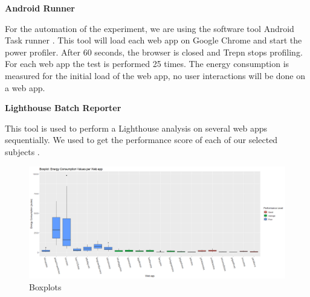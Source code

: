 \textbf{Android Runner}

For the automation of the experiment, we are using the software tool Android Task runner \cite{WEBSITE:10}. This tool will load each web app on Google Chrome and start the power profiler. After 60 seconds, the browser is closed and Trepn stops profiling. For each web app the test is performed 25 times. The energy consumption is measured for the initial load of the web app, no user interactions will be done on a web app.
\newline


\textbf{Lighthouse Batch Reporter}

This tool is used to perform a Lighthouse analysis on several web apps sequentially. We used to get the performance score of each of our selected subjects \cite{WEBSITE:12}.

\begin{figure}
  \includegraphics[width=\textwidth]{./NewImages/Fig_3_Boxplot_for_All_Websites.png}
  \caption{Boxplots}
  \label{fig:boxplots-all}
\end{figure}